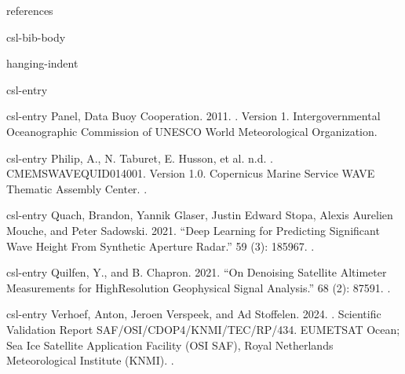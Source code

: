 \documentclass[a4paper,10pt,english]{sphinxmanual}
\begin{document}
\begin{sphinxuseclass}{references}
\begin{sphinxuseclass}{csl-bib-body}
\begin{sphinxuseclass}{hanging-indent}
\begin{sphinxuseclass}{csl-entry}
\end{sphinxuseclass}
\begin{sphinxuseclass}{csl-entry}
\sphinxAtStartPar
Panel, Data Buoy Cooperation. 2011. . Version 1. Intergovernmental Oceanographic Commission of UNESCO \sphinxhyphen{} World Meteorological Organization.

\end{sphinxuseclass}
\begin{sphinxuseclass}{csl-entry}
\sphinxAtStartPar
Philip, A., N. Taburet, E. Husson, et al. n.d. . CMEMS\sphinxhyphen{}WAVE\sphinxhyphen{}QUID\sphinxhyphen{}014\sphinxhyphen{}001. Version 1.0. Copernicus Marine Service WAVE Thematic Assembly Center. .

\end{sphinxuseclass}
\begin{sphinxuseclass}{csl-entry}
\sphinxAtStartPar
Quach, Brandon, Yannik Glaser, Justin Edward Stopa, Alexis Aurelien Mouche, and Peter Sadowski. 2021. “Deep Learning for Predicting Significant Wave Height From Synthetic Aperture Radar.”  59 (3): 1859\textendash{}67. .

\end{sphinxuseclass}
\begin{sphinxuseclass}{csl-entry}
\sphinxAtStartPar
Quilfen, Y., and B. Chapron. 2021. “On Denoising Satellite Altimeter Measurements for High\sphinxhyphen{}Resolution Geophysical Signal Analysis.”  68 (2): 875\textendash{}91. .

\end{sphinxuseclass}
\begin{sphinxuseclass}{csl-entry}
\sphinxAtStartPar
Verhoef, Anton, Jeroen Verspeek, and Ad Stoffelen. 2024. . Scientific Validation Report SAF/OSI/CDOP4/KNMI/TEC/RP/434. EUMETSAT Ocean; Sea Ice Satellite Application Facility (OSI SAF), Royal Netherlands Meteorological Institute (KNMI). .


\end{sphinxuseclass}
\end{sphinxuseclass}
\end{sphinxuseclass}
\end{sphinxuseclass}
\end{document}
